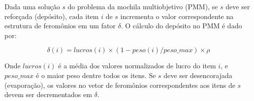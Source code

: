 Dada uma solução $s$ do problema da mochila multiobjetivo (PMM), se $s$ deve ser reforçada (depósito), cada item $i$ de $s$ incrementa o valor correspondente na estrutura de feromônios em um fator $\delta$. O cálculo do depósito no PMM é dado por:

\[\delta(i) = lucros(i) \times (1 - peso(i) / peso\_{max}) \times \rho\]

Onde $lucros(i)$ é a média dos valores normalizados de lucro do item $i$, e $peso\_{max}$ é o maior peso dentre todos os itens. Se $s$ deve ser desencorajada (evaporação), os valores no vetor de feromônios correspondentes aos itens de $s$ devem ser decrementados em $\delta$.

